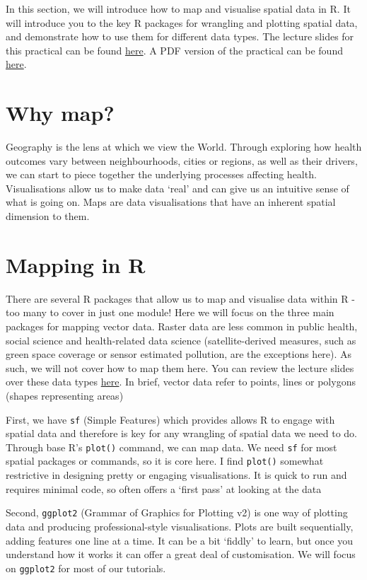 \documentclass[
]{book}
\begin{document}
In this section, we will introduce how to map and visualise spatial data in R. It will introduce you to the key R packages for wrangling and plotting spatial data, and demonstrate how to use them for different data types. The lecture slides for this practical can be found \href{}{here}. A PDF version of the practical can be found \href{}{here}.

\hypertarget{why-map}{%
\section{Why map?}\label{why-map}}

Geography is the lens at which we view the World. Through exploring how health outcomes vary between neighbourhoods, cities or regions, as well as their drivers, we can start to piece together the underlying processes affecting health. Visualisations allow us to make data `real' and can give us an intuitive sense of what is going on. Maps are data visualisations that have an inherent spatial dimension to them.

\hypertarget{mapping-in-r}{%
\section{Mapping in R}\label{mapping-in-r}}

There are several R packages that allow us to map and visualise data within R - too many to cover in just one module! Here we will focus on the three main packages for mapping vector data. Raster data are less common in public health, social science and health-related data science (satellite-derived measures, such as green space coverage or sensor estimated pollution, are the exceptions here). As such, we will not cover how to map them here. You can review the lecture slides over these data types \href{}{here}. In brief, vector data refer to points, lines or polygons (shapes representing areas)

First, we have \texttt{sf} (Simple Features) which provides allows R to engage with spatial data and therefore is key for any wrangling of spatial data we need to do. Through base R's \texttt{plot()} command, we can map data. We need \texttt{sf} for most spatial packages or commands, so it is core here. I find \texttt{plot()} somewhat restrictive in designing pretty or engaging visualisations. It is quick to run and requires minimal code, so often offers a `first pass' at looking at the data

Second, \texttt{ggplot2} (Grammar of Graphics for Plotting v2) is one way of plotting data and producing professional-style visualisations. Plots are built sequentially, adding features one line at a time. It can be a bit `fiddly' to learn, but once you understand how it works it can offer a great deal of customisation. We will focus on \texttt{ggplot2} for most of our tutorials.
\end{document}
